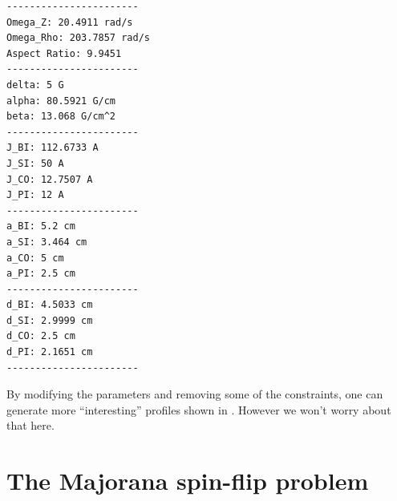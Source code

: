 \documentclass{article}
\theoremstyle{definition}
\begin{document}
\begin{lstlisting}
-----------------------
Omega_Z: 20.4911 rad/s
Omega_Rho: 203.7857 rad/s
Aspect Ratio: 9.9451
-----------------------
delta: 5 G
alpha: 80.5921 G/cm
beta: 13.068 G/cm^2
-----------------------
J_BI: 112.6733 A
J_SI: 50 A
J_CO: 12.7507 A
J_PI: 12 A
-----------------------
a_BI: 5.2 cm
a_SI: 3.464 cm
a_CO: 5 cm
a_PI: 2.5 cm
-----------------------
d_BI: 4.5033 cm
d_SI: 2.9999 cm
d_CO: 2.5 cm
d_PI: 2.1651 cm
-----------------------
\end{lstlisting}

By modifying the parameters and removing some of the constraints, one can generate more ``interesting'' profiles shown in \cite{allcoil}. However we won't worry about that here. 





\section{The Majorana spin-flip problem}





 
	
\end{document}
